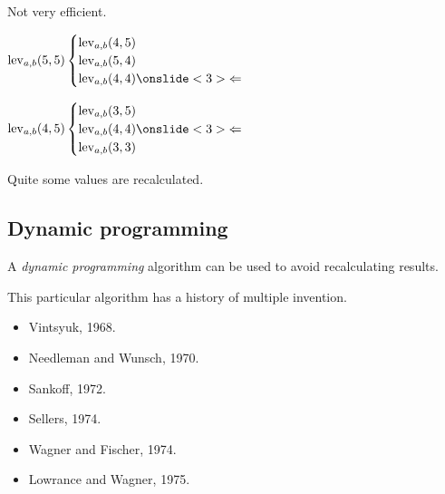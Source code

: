 \documentclass[slidestop]{beamer}
\begin{document}
\begin{pframe}
  Not very efficient.
  \bigskip

  \begin{math}
    \operatorname{lev}_{a, b}(5, 5) \begin{cases}
      \operatorname{lev}_{a, b}(4, 5) \\
      \operatorname{lev}_{a, b}(5, 4) \\
      \operatorname{lev}_{a, b}(4, 4) \onslide<3>{\Leftarrow}
    \end{cases}
  \end{math}
  \bigskip
  \pause

  \begin{math}
    \operatorname{lev}_{a, b}(4, 5) \begin{cases}
      \operatorname{lev}_{a, b}(3, 5) \\
      \operatorname{lev}_{a, b}(4, 4) \onslide<3>{\Leftarrow}\\
      \operatorname{lev}_{a, b}(3, 3)
    \end{cases}
  \end{math}
  \bigskip

  Quite some values are recalculated.
\end{pframe}

\subsection{Dynamic programming}
\begin{pframe}
  A \emph{dynamic programming} algorithm can be used to avoid recalculating
  results.
  \bigskip

  This particular algorithm has a history of multiple invention.
  \begin{itemize}
    \item Vintsyuk, 1968.
    \item Needleman and Wunsch, 1970.
    \item Sankoff, 1972.
    \item Sellers, 1974.
    \item Wagner and Fischer, 1974.
    \item Lowrance and Wagner, 1975.
  \end{itemize}
  \vfill

\end{pframe}
\end{document}
